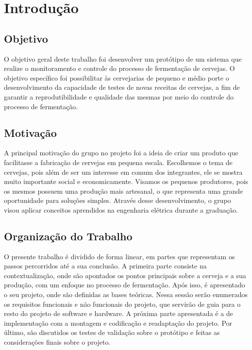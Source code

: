 \chapter{Introdução}

\section{Objetivo}

O objetivo geral deste trabalho foi desenvolver um protótipo de um sistema que realize o monitoramento e controle do processo de fermentação de cervejas.
O objetivo específico foi possibilitar às cervejarias de pequeno e médio porte o desenvolvimento da capacidade de testes de novas receitas de cervejas, 
a fim de garantir a reprodutibilidade e qualidade das mesmas por meio do controle do processo de fermentação.

\section{Motivação}

A principal motivação do grupo no projeto foi a ideia de criar um produto que facilitasse a fabricação de cervejas em pequena escala. Escolhemos o tema de cervejas, pois além de ser um interesse em comum dos integrantes, ele se mostra muito importante social e economicamente. Visamos os pequenos produtores, pois os mesmos possuem uma produção mais artesanal, o que representa uma grande oportunidade para soluções simples. Através desse desenvolvimento, o grupo visou aplicar conceitos aprendidos na engenharia elétrica durante a graduação. 

\section{Organização do Trabalho}

O presente trabalho é dividido de forma linear, em partes que representam os passos percorridos até a sua conclusão. A primeira parte consiste na contextualização, onde são apontados os pontos principais sobre a cerveja e a sua produção, com um enfoque no processo de fermentação. Após isso, é apresentado o seu projeto, onde são definidas as bases teóricas. Nessa sessão serão enumerados os requisitos funcionais e não funcionais do projeto, que servirão de guia para o resto do projeto de software e hardware. A próxima parte apresentada é a de implementação com a montagem e codificação e readaptação do projeto. Por último, são discutidos os testes de validação sobre o protótipo e feitas as considerações finais sobre o projeto.
